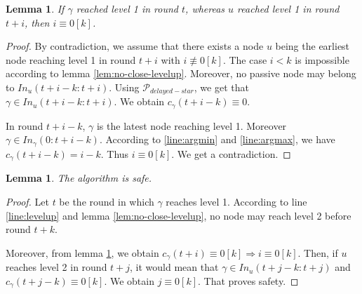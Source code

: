 \documentclass[11pt,letterpaper]{article}
\newtheorem{lem}[thm]{Lemma}
\newcommand{\cent}{\gamma}
\begin{document}
\begin{lem} \label{lem:later-level}
	If $\cent$ reached level 1 in round $t$, whereas $u$ reached level 1 in round $t+i$, then $i \equiv 0 [k]$. 
\end{lem}
\begin{proof}
	By contradiction, we assume that there exists a node $u$ being the earliest node reaching level 1 in round $t+i$ with $i \not\equiv 0 [k]$.
	The case $i < k$ is impossible according to lemma \ref{lem:no-close-levelup}.
	Moreover, no passive node may belong to $In_u(t+i-k:t+i)$.
	Using $\mathcal{P}_{delayed-star}$, we get that $\cent \in In_u(t+i-k:t+i)$.
	We obtain $c_\cent(t+i-k) \equiv 0$.

	In round $t+i-k$, $\cent$ is the latest node reaching level 1. Moreover $\cent \in In_\cent(0:t+i-k)$.
	According to \ref{line:argmin} and \ref{line:argmax}, we have $c_\cent(t+i-k) = i-k$.
	Thus $i \equiv 0 [k]$. We get a contradiction.
\end{proof}

\begin{lem}
	The algorithm is safe.
\end{lem}
\begin{proof}
	Let $t$ be the round in which $\cent$ reaches level 1.
	According to line \ref{line:levelup} and lemma \ref{lem:no-close-levelup}, no node may reach level 2 before round $t+k$.

	Moreover, from lemma \ref{lem:later-level}, we obtain $c_\cent(t+i) \equiv 0 [k] \Rightarrow i \equiv 0 [k]$.
	Then, if $u$ reaches level 2 in round $t+j$, it would mean that $\cent \in In_u(t+j-k:t+j)$ and $c_\cent(t+j-k) \equiv 0 [k]$.
	We obtain $j \equiv 0 [k]$. That proves safety.
\end{proof}
\end{document}
